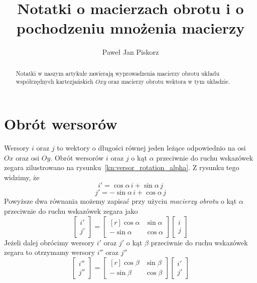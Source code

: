 \documentclass[12pt,a4paper,leqno]{article}
\title{Notatki o macierzach obrotu i o pochodzeniu mnożenia macierzy}
\author{Paweł Jan Piskorz}
\date{}
\numberwithin{equation}{section}
\begin{document}
\maketitle

\begin{abstract}
Notatki w naszym artykule zawierają wyprowadzenia macierzy obrotu układu współrzędnych kartezjańskich $Oxy$
oraz macierzy obrotu wektora w tym układzie.
\end{abstract}



\section{Obrót wersorów}\label{sec1}


Wersory $i$ oraz $j$ to wektory o długości równej jeden leżące odpowiednio na osi $Ox$ oraz osi $Oy$\@.
Obrót wersorów $i$ oraz $j$ o kąt $\alpha$ przeciwnie do ruchu wskazówek zegara
zilustrowano na rysunku~\ref{kn:versor_rotation_alpha}\@.
Z rysunku tego widzimy, że
\begin{equation}
i' = \cos \alpha \, i + \sin \alpha \, j    
\end{equation}
\begin{equation}
j' = -\sin \alpha \, i + \cos \alpha \, j    
\end{equation}
Powyższe dwa równania możemy zapisać przy użyciu {\em macierzy obrotu\/} o kąt $\alpha$
przeciwnie do ruchu wskazówek zegara jako
\begin{equation}
\begin{bmatrix}
i' \\ 
j' 
\end{bmatrix}
=
\begin{bmatrix*}[r]
 \cos \alpha  & \sin \alpha  \\
-\sin \alpha  & \cos \alpha
\end{bmatrix*}
\begin{bmatrix}
i \\ 
j 
\end{bmatrix}
\end{equation}
Jeżeli dalej obrócimy wersory $i'$ oraz $j'$ o kąt $\beta$
przeciwnie do ruchu wskazówek zegara to otrzymamy wersory $i''$ oraz $j''$
\begin{equation}
\begin{bmatrix}
i'' \\ 
j'' 
\end{bmatrix}
=
\begin{bmatrix*}[r]
 \cos \beta  & \sin \beta  \\
-\sin \beta  & \cos \beta
\end{bmatrix*}
\begin{bmatrix}
i' \\ 
j' 
\end{bmatrix}
\end{equation}
\end{document}
